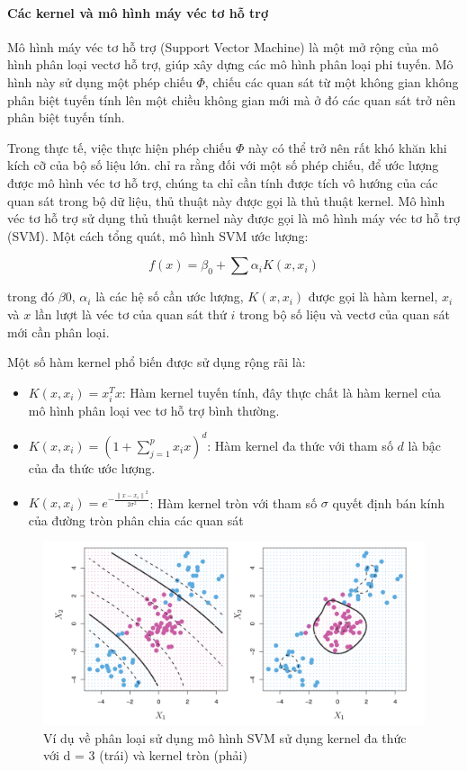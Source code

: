 \documentclass[a4paper]{report}\usepackage[]{graphicx}\usepackage[]{color}
\begin{document}
\paragraph{Các kernel và mô hình máy véc tơ hỗ trợ}

Mô hình máy véc tơ hỗ trợ (Support Vector Machine) là một mở rộng của mô hình phân loại vectơ hỗ trợ, giúp xây dựng các mô hình phân loại phi tuyến. Mô hình này sử dụng một phép chiếu $\Phi$, chiếu các quan sát từ một không gian không phân biệt tuyến tính lên một chiều không gian mới mà ở đó các quan sát trở nên phân biệt tuyến tính.

Trong thực tế, việc thực hiện phép chiếu $\Phi$ này có thể trở nên rất khó khăn khi kích cỡ của bộ số liệu lớn. \textcite{scholkopf1999advances} chỉ ra rằng đối với một số phép chiếu, để ước lượng được mô hình véc tơ hỗ trợ, chúng ta chỉ cần tính được tích vô hướng của các quan sát trong bộ dữ liệu, thủ thuật này được gọi là thủ thuật kernel. Mô hình véc tơ hỗ trợ sử dụng thủ thuật kernel này được gọi là mô hình máy véc tơ hỗ trợ (SVM). Một cách tổng quát, mô hình SVM ước lượng:

$$
f(x) = \beta_0 + \sum\alpha_i K(x, x_i)
$$

trong đó $\beta0$, $\alpha_i$ là các hệ số cần ước lượng, $K(x, x_i)$ được gọi là hàm kernel, $x_i$ và $x$ lần lượt là véc tơ của quan sát thứ $i$ trong bộ số liệu và vectơ của quan sát mới cần phân loại.

Một số hàm kernel phổ biến được sử dụng rộng rãi là:

\begin{itemize}
  \item{$K(x, x_i) = x_i^T x$}: Hàm kernel tuyến tính, đây thực chất là hàm kernel của mô hình phân loại vec tơ hỗ trợ bình thường.
  \item{$K(x, x_i) =  (1 + \sum_{j = 1}^p x_i x)^d$}: Hàm kernel đa thức với tham số $d$ là bậc của đa thức ước lượng.
  \item{$K(x, x_i) = e^{-\frac{{\|x - x_i\|}^2}{2 \sigma^2}}$}: Hàm kernel tròn với tham số $\sigma$ quyết định bán kính của đường tròn phân chia các quan sát
\end{itemize}

\begin{figure}
  \centering
    \includegraphics[width=\textwidth]{./Figures/svm_kernel_example.png}
  \caption[Ví dụ về phân loại sử dụng mô hình SVM]{Ví dụ về phân loại sử dụng mô hình SVM sử dụng kernel đa thức với d = 3 (trái) và kernel tròn (phải)}
  \label{fig:svm_kernel_example}
\end{figure}
\end{document}
